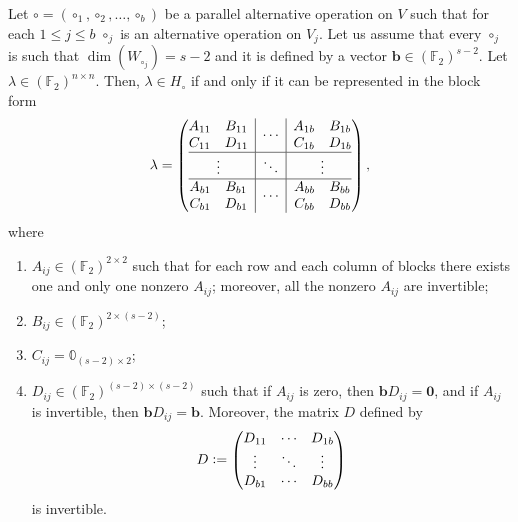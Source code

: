 \documentclass[runningheads,a4paper,english]{llncs}
\newcommand{\F}{\mathbb{F}}
\newcommand{\lb}{\lambda}
\newcommand{\defeq}{\vcentcolon=}
\renewcommand{\b}{\textbf{b}}
\begin{document}
\begin{theorem}
	\label{thm:caratt_h0_msomme}
	Let $\circ =(\circ_{1}, \circ_{2}, \dots, \circ_{b})$ be a parallel alternative operation on $V$ such that for each $1\leq j \leq b$ $\circ_j$ is an alternative operation on $V_j$. Let us assume that every $\circ_{j}$ is such that $\dim(W_{\circ_j}) = s-2$ and it is defined by a vector $\b \in (\F_2)^{s-2}$.
	Let $\lb \in (\F_2)^{n\times n}$. Then, $\lb \in H_\circ$ if and only if it can be represented in the block form
	\[ 
	\lambda = 
	\left(\begin{array}{@{}c|c|c@{}}
		\begin{matrix}
			A_{11} & B_{11} \\
			C_{11} & D_{11}
		\end{matrix}
		&
		\cdots
		&
		\begin{matrix}
			A_{1b} & B_{1b} \\
			C_{1b} & D_{1b}
		\end{matrix}
		\\
		\hline
		\vdots
		&
		\ddots
		&
		\vdots
		\\
		\hline
		\begin{matrix}
			A_{b1} & B_{b1} \\
			C_{b1} & D_{b1}
		\end{matrix}
		&
		\cdots
		&
		\begin{matrix}
			A_{bb} & B_{bb} \\
			C_{bb} & D_{bb}
		\end{matrix}
		\\
	\end{array}\right),
	\]
	where
	\begin{enumerate}
		\item $A_{ij} \in (\F_2)^{2\times 2}$ such that for each row and each column of blocks there exists one and only one nonzero $A_{ij}$; moreover, all the nonzero $A_{ij}$ are invertible;
		\item $B_{ij} \in (\F_2)^{2 \times (s-2)}$;
		\item $C_{ij} = \mathbb{0}_{(s-2) \times 2}$;
		\item $D_{ij} \in (\F_2)^{(s-2) \times (s-2)}$ such that if $A_{ij}$ is zero, then $\b D_{ij}=\textbf{0}$, and if $A_{ij}$ is invertible, then $\b D_{ij} = \b$. Moreover, the matrix $D$ defined by
		\[
		D \defeq
		\begin{pmatrix}
			D_{11} & \cdots & D_{1b} \\
			\vdots & \ddots & \vdots \\
			D_{b1} & \cdots & D_{bb}
		\end{pmatrix}
		\]
		is invertible.
	\end{enumerate}
\end{theorem}
\end{document}
